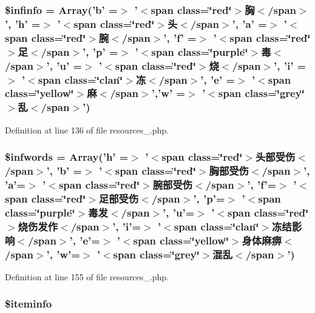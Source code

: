 \hypertarget{resources__1_8php_a33e1d274ac0cd7ca76b5cc43833f5c1f}{
\subsubsection[{\$infinfo}]{\setlength{\rightskip}{0pt plus 5cm}\$infinfo = Array('b' =$>$ '$<$span class=\char`\"{}red\char`\"{}$>$胸$<$/span$>$', 'h' =$>$ '$<$span class=\char`\"{}red\char`\"{}$>$头$<$/span$>$', 'a' =$>$ '$<$span class=\char`\"{}red\char`\"{}$>$腕$<$/span$>$', 'f' =$>$ '$<$span class=\char`\"{}red\char`\"{}$>$足$<$/span$>$', 'p' =$>$ '$<$span class=\char`\"{}purple\char`\"{}$>$毒$<$/span$>$', 'u' =$>$ '$<$span class=\char`\"{}red\char`\"{}$>$烧$<$/span$>$', 'i' =$>$ '$<$span class=\char`\"{}clan\char`\"{}$>$冻$<$/span$>$', 'e' =$>$ '$<$span class=\char`\"{}yellow\char`\"{}$>$麻$<$/span$>$','w' =$>$ '$<$span class=\char`\"{}grey\char`\"{}$>$乱$<$/span$>$')}}\label{resources__1_8php_a33e1d274ac0cd7ca76b5cc43833f5c1f}


Definition at line 136 of file resources\+\_.\+php.

\hypertarget{resources__1_8php_ac3527ff4180f28da3e03cb071838cc4d}{
\subsubsection[{\$infwords}]{\setlength{\rightskip}{0pt plus 5cm}\$infwords = Array('h' =$>$ '$<$span class=\char`\"{}red\char`\"{}$>$头部受伤$<$/span$>$', 'b' =$>$ '$<$span class=\char`\"{}red\char`\"{}$>$胸部受伤$<$/span$>$', 'a'=$>$ '$<$span class=\char`\"{}red\char`\"{}$>$腕部受伤$<$/span$>$', 'f'=$>$ '$<$span class=\char`\"{}red\char`\"{}$>$足部受伤$<$/span$>$', 'p'=$>$ '$<$span class=\char`\"{}purple\char`\"{}$>$毒发$<$/span$>$', 'u'=$>$ '$<$span class=\char`\"{}red\char`\"{}$>$烧伤发作$<$/span$>$', 'i'=$>$ '$<$span class=\char`\"{}clan\char`\"{}$>$冻结影响$<$/span$>$', 'e'=$>$ '$<$span class=\char`\"{}yellow\char`\"{}$>$身体麻痹$<$/span$>$', 'w'=$>$ '$<$span class=\char`\"{}grey\char`\"{}$>$混乱$<$/span$>$')}}\label{resources__1_8php_ac3527ff4180f28da3e03cb071838cc4d}


Definition at line 155 of file resources\+\_.\+php.

\hypertarget{resources__1_8php_abf61f517048be2c7cc3d9c24e62f1160}{
\subsubsection[{\$iteminfo}]{\setlength{\rightskip}{0pt plus 5cm}\$iteminfo}}\label{resources__1_8php_abf61f517048be2c7cc3d9c24e62f1160}


